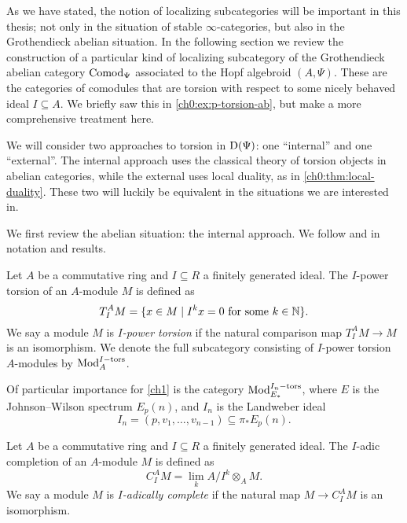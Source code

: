 As we have stated, the notion of localizing subcategories will be important in this thesis; not only in the situation of stable $\infty$-categories, but also in the Grothendieck abelian situation. In the following section we review the construction of a particular kind of localizing subcategory of the Grothendieck abelian category $\mathrm{Comod}_\Psi$ associated to the Hopf algebroid $(A,\Psi)$. These are the categories of comodules that are torsion with respect to some nicely behaved ideal $I\subseteq A$. We briefly saw this in \cref{ch0:ex:p-torsion-ab}, but make a more comprehensive treatment here. 

We will consider two approaches to torsion in $\mathrm{D}(\Psi)$: one ``internal'' and one ``external''. The internal approach uses the classical theory of torsion objects in abelian categories, while the external uses local duality, as in \cref{ch0:thm:local-duality}. These two will luckily be equivalent in the situations we are interested in. 

We first review the abelian situation: the internal approach. We follow \cite{barthel-heard-valenzuela_2018} and \cite{barthel-heard-valenzuela_2020} in notation and results. 

\begin{definition}
    \label{def:I-power-torsion-module}
    Let $A$ be a commutative ring and $I\subseteq R$ a finitely generated ideal. The $I$-power torsion of an $A$-module $M$ is defined as
    \[T_I^A M = \{x\in M \mid I^k x = 0 \text{ for some } k\in \mathbb{N}\}.\]
    We say a module $M$ is \emph{$I$-power torsion} if the natural comparison map $T_I^A M\longrightarrow M$ is an isomorphism. We denote the full subcategory consisting of $I$-power torsion $A$-modules by $\mathrm{Mod}_A^{I-\mathrm{tors}}$. 
\end{definition}

\begin{example}
    Of particular importance for \cref{ch1} is the category $\mathrm{Mod}_{E_*}^{I_n-\mathrm{tors}}$, where $E$ is the Johnson--Wilson spectrum $E_p(n)$, and $I_n$ is the Landweber ideal 
    \[I_n = (p, v_1, \ldots, v_{n-1})\subseteq \pi_* E_p(n).\]
\end{example}

\begin{definition}
    Let $A$ be a commutative ring and $I\subseteq R$ a finitely generated ideal. The $I$-adic completion of an $A$-module $M$ is defined as
    \[C_I^A M = \lim_k A/I^k\otimes_A M.\]
    We say a module $M$ is \emph{$I$-adically complete} if the natural map $M\longrightarrow C_I^A M$ is an isomorphism. 
\end{definition}

